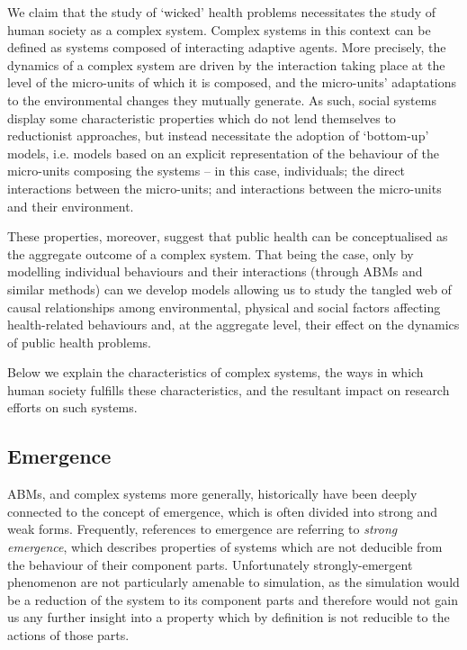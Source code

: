 \documentclass[review]{elsarticle}
\begin{document}
We claim that the study of `wicked' health problems necessitates the study of human society as a complex system. Complex systems in this context can be defined as systems composed of interacting adaptive agents. More precisely, the dynamics of a complex system are driven by the interaction taking place at the level of the micro-units of which it is composed, and the micro-units' adaptations to the environmental changes they mutually generate. As such, social systems display some characteristic properties which do not lend themselves to reductionist approaches, but instead necessitate the adoption of `bottom-up' models, i.e. models based on an explicit representation of the behaviour of the micro-units composing the systems -- in this case, individuals; the direct interactions between the micro-units; and interactions between the micro-units and their environment. 
  
These properties, moreover, suggest that public health can be conceptualised as the aggregate outcome of a complex system.  That being the case, only by modelling individual behaviours and their interactions (through ABMs and similar methods) can we develop models allowing us to study the tangled web of causal relationships among environmental, physical and social factors affecting health-related behaviours and, at the aggregate level, their effect on the dynamics of public health problems.

Below we explain the characteristics of complex systems, the ways in which human society fulfills these characteristics, and the resultant impact on research efforts on such systems. 
 
\subsection{Emergence}
ABMs, and complex systems more generally, historically have been deeply connected to the concept of emergence, which is often divided into strong and weak forms.  Frequently, references to emergence are referring to \emph{strong emergence}, which describes properties of systems which are not deducible from the behaviour of their component parts.  Unfortunately strongly-emergent phenomenon are not particularly amenable to simulation, as the simulation would be a reduction of the system to its component parts and therefore would not gain us any further insight into a property which by definition is not reducible to the actions of those parts.
\end{document}
